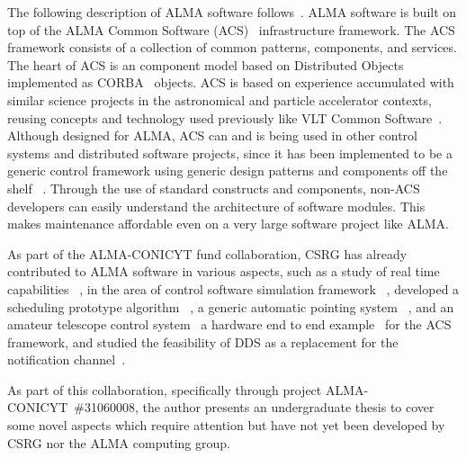The following description of ALMA software follows~\cite{avarias08:_DDS_vs_NS}.
ALMA software
is built on top of the ALMA Common Software (ACS)~%
 \cite{chiozzi01:_ACS,gianluca06:_ACS_overview}
infrastructure framework.
The ACS framework consists of a collection of common
patterns, components, and services. The heart of ACS is an component model
based on Distributed Objects implemented as CORBA~\cite{CORBA-OMG02} objects.
ACS is based on experience accumulated with similar science projects in the
astronomical and particle accelerator contexts, reusing concepts and
technology used previously like VLT Common
Software~\cite{sivera01:_vlt_overview}. Although designed for ALMA, ACS can
and is being
used in other control systems and distributed software projects, since it
has been implemented to be a generic control framework using generic design
patterns and components off the shelf~%
\cite{chiozzi08:_enabling_softw_sharin}.
Through the use of standard constructs and components, non-ACS developers
can easily understand the architecture of software modules. This makes
maintenance affordable even on a very large software project like ALMA.


As part of the ALMA-CONICYT fund collaboration,
CSRG has already contributed to ALMA software in
various aspects, such as a study of real time capabilities~%
  \cite{araya08:_verifiying_ACS_RT_periodic_properties,%
       tobar09:_real_time_time_service_ACS}
, in the area of control software simulation framework~%
  \cite{mora08:_hardw_devic_simul_framew_alma_contr_subsy,%
        mora08:_towar_gener_hardw_devic_simul}
, developed a scheduling prototype algorithm~%
  \cite{saez09:_sched_protot_amateur_teles_contr_acs},
  a generic automatic pointing system~%
  \cite{staig08:_refer_implem_gener_autom_point_system},
  and an amateur telescope control system~%
  \cite{tobar08:_csat_gtcs, tobar08:_CSAT_final_status}
  a hardware end to end example~\cite{valencia07:_H3E} for
  the ACS framework,
  and studied the feasibility of DDS as a replacement for the notification
  channel~\cite{avarias08:_DDS_vs_NS}.

As part of this collaboration,
specifically through project ALMA-CONICYT~\#31060008,
the author presents an undergraduate
thesis to cover some novel aspects which require attention
but have not yet been developed by CSRG nor the ALMA computing group.


